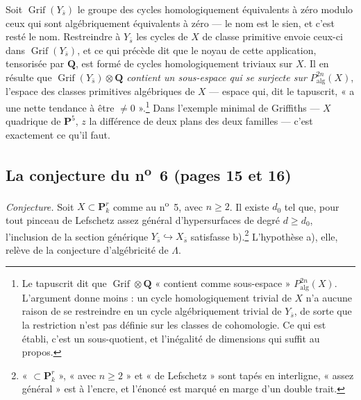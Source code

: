 \documentclass[11pt,a4paper]{article}
\begin{document}
Soit $\operatorname{Grif}(Y_{\bar s})$ le groupe des cycles homologiquement
équivalents à zéro modulo ceux qui sont algébriquement équivalents à zéro --- le
nom est le sien, et c'est resté le nom. Restreindre à $Y_{\bar s}$ les cycles de
$X$ de classe primitive envoie ceux-ci dans $\operatorname{Grif}(Y_{\bar s})$,
et ce qui précède dit que le noyau de cette application, tensorisée par
$\mathbf{Q}$, est formé de cycles homologiquement triviaux sur $X$. Il en résulte
que \emph{$\operatorname{Grif}(Y_{\bar s}) \otimes \mathbf{Q}$ contient un
sous-espace qui se surjecte sur $P^{2n}_{\mathrm{alg}}(X)$}, l'espace des classes
primitives algébriques de $X$ --- espace qui, dit le tapuscrit, « a une nette
tendance à être $\neq 0$ ».\footnote{Le tapuscrit dit que $\operatorname{Grif}
\otimes \mathbf{Q}$ « contient comme sous-espace » $P^{2n}_{\mathrm{alg}}(X)$.
L'argument donne moins : un cycle homologiquement trivial de $X$ n'a aucune raison
de se restreindre en un cycle algébriquement trivial de $Y_{\bar s}$, de sorte
que la restriction n'est pas définie sur les classes de cohomologie. Ce qui est
établi, c'est un sous-quotient, et l'inégalité de dimensions qui suffit au
propos.} Dans l'exemple minimal de Griffiths --- $X$ quadrique de
$\mathbf{P}^5$, $z$ la différence de deux plans des deux familles --- c'est
exactement ce qu'il faut.

\subsection*{La conjecture du n\textsuperscript{o}~6 (pages 15 et 16)}

\emph{Conjecture.} Soit $X \subset \mathbf{P}^r_k$ comme au
n\textsuperscript{o}~5, avec $n \geqslant 2$. Il existe $d_0$ tel que, pour tout
pinceau de Lefschetz assez général d'hypersurfaces de degré $d \geqslant d_0$,
l'inclusion de la section générique $Y_{\bar s} \hookrightarrow X_{\bar s}$
satisfasse b).\footnote{« $\subset \mathbf{P}^r_k$ », « avec $n \geqslant 2$ »
et « de Lefschetz » sont tapés en interligne, « assez général » est à l'encre, et
l'énoncé est marqué en marge d'un double trait.} L'hypothèse a), elle, relève
de la conjecture d'algébricité de $\Lambda$.
\end{document}
